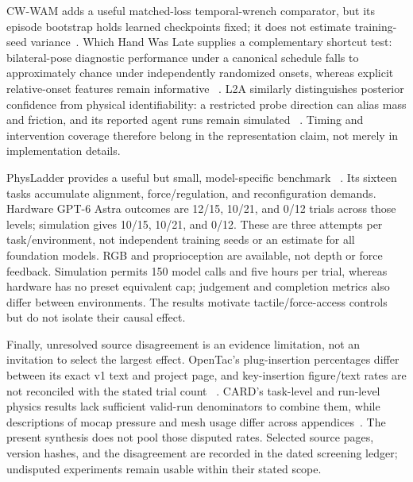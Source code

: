 CW-WAM adds a useful matched-loss temporal-wrench comparator, but its episode
bootstrap holds learned checkpoints fixed; it does not estimate training-seed
variance~\cite{update2026cwwam}. Which Hand Was Late supplies a complementary
shortcut test: bilateral-pose diagnostic performance under a canonical schedule
falls to approximately chance under independently randomized onsets, whereas
explicit relative-onset features remain informative
~\cite{update2026whichhand}. L2A similarly distinguishes posterior confidence
from physical identifiability: a restricted probe direction can alias mass and
friction, and its reported agent runs remain simulated
~\cite{update2026l2a}. Timing and intervention coverage therefore belong in the
representation claim, not merely in implementation details.

PhysLadder provides a useful but small, model-specific benchmark
~\cite{update2026physladder}. Its sixteen tasks accumulate alignment,
force/regulation, and reconfiguration demands. Hardware GPT-6 Astra outcomes
are 12/15, 10/21, and 0/12 trials across those levels; simulation gives 10/15,
10/21, and 0/12. These are three attempts per task/environment, not independent
training seeds or an estimate for all foundation models. RGB and proprioception
are available, not depth or force feedback. Simulation permits 150 model calls
and five hours per trial, whereas hardware has no preset equivalent cap;
judgement and completion metrics also differ between environments. The results
motivate tactile/force-access controls but do not isolate their causal effect.

Finally, unresolved source disagreement is an evidence limitation, not an
invitation to select the largest effect. OpenTac's plug-insertion percentages
differ between its exact v1 text and project page, and key-insertion figure/text
rates are not reconciled with the stated trial count
~\cite{update2026opentac}. CARD's task-level and run-level physics results lack
sufficient valid-run denominators to combine them, while descriptions of mocap
pressure and mesh usage differ across appendices~\cite{update2026card}.
The present synthesis does not pool those disputed rates. Selected source pages,
version hashes, and the disagreement are recorded in the dated screening ledger;
undisputed experiments remain usable within their stated scope.

\FloatBarrier


